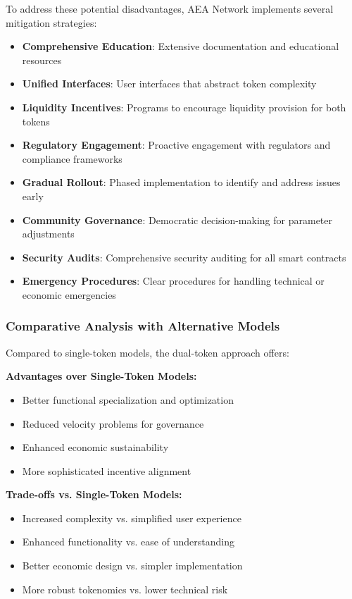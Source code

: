 \documentclass[12pt,a4paper]{article}
\begin{document}
To address these potential disadvantages, AEA Network implements several mitigation strategies:

\begin{itemize}
\item \textbf{Comprehensive Education}: Extensive documentation and educational resources
\item \textbf{Unified Interfaces}: User interfaces that abstract token complexity
\item \textbf{Liquidity Incentives}: Programs to encourage liquidity provision for both tokens
\item \textbf{Regulatory Engagement}: Proactive engagement with regulators and compliance frameworks
\item \textbf{Gradual Rollout}: Phased implementation to identify and address issues early
\item \textbf{Community Governance}: Democratic decision-making for parameter adjustments
\item \textbf{Security Audits}: Comprehensive security auditing for all smart contracts
\item \textbf{Emergency Procedures}: Clear procedures for handling technical or economic emergencies
\end{itemize}

\subsubsection{Comparative Analysis with Alternative Models}

Compared to single-token models, the dual-token approach offers:

\textbf{Advantages over Single-Token Models:}
\begin{itemize}
\item Better functional specialization and optimization
\item Reduced velocity problems for governance
\item Enhanced economic sustainability
\item More sophisticated incentive alignment
\end{itemize}

\textbf{Trade-offs vs. Single-Token Models:}
\begin{itemize}
\item Increased complexity vs. simplified user experience
\item Enhanced functionality vs. ease of understanding
\item Better economic design vs. simpler implementation
\item More robust tokenomics vs. lower technical risk
\end{itemize}
\end{document}
